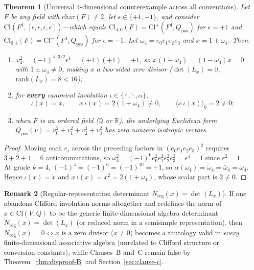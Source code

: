 \documentclass[11pt]{article}
\newtheorem{theorem}{Theorem}[section]
\theoremstyle{definition}
\newtheorem{remark}[theorem]{Remark}
\newcommand{\Cl}{\mathrm{Cl}}
\newcommand{\Nreg}{N_{\mathrm{reg}}}
\begin{document}
\begin{theorem}[Universal $4$-dimensional counterexample across all conventions]
\label{thm:dim4-universal}
Let $F$ be any field with $\mathrm{char}(F) \neq 2$, let $\epsilon \in \{+1, -1\}$,
and consider $\Cl(F^4, [\epsilon, \epsilon, \epsilon, \epsilon])$---which equals
$\Cl_{4,0}(F) = \Cl^+(F^4, Q_{\mathrm{pos}})$ for $\epsilon = +1$ and
$\Cl_{0,4}(F) = \Cl^-(F^4, Q_{\mathrm{pos}})$ for $\epsilon = -1$. Let
$\omega_4 = e_0 e_1 e_2 e_3$ and $x = 1 + \omega_4$. Then:
\begin{enumerate}
  \item $\omega_4^2 = (-1)^{4\cdot 3/2} \epsilon^4 = (+1)(+1) = +1$, so
    $x(1 - \omega_4) = (1 - \omega_4)x = 0$ with $1 \pm \omega_4 \neq 0$, making $x$
    a two-sided zero divisor ($\det(L_x) = 0$, $\mathrm{rank}(L_x) = 8 < 16$);
  \item for \textbf{every} canonical involution $\iota \in \{\bar{\cdot}, \tilde{\cdot}, \alpha\}$,
    \[
      \iota(x) = x, \qquad
      x\,\iota(x) = 2(1 + \omega_4) \neq 0, \qquad
      \langle x\,\iota(x)\rangle_0 = 2 \neq 0;
    \]
  \item when $F$ is an ordered field ($\mathbb{Q}$ or $\mathbb{R}$), the underlying
    Euclidean form $Q_{\mathrm{pos}}(v) = v_0^2 + v_1^2 + v_2^2 + v_3^2$ has zero
    nonzero isotropic vectors.
\end{enumerate}
\end{theorem}
\begin{proof}
Moving each $e_i$ across the preceding factors in $(e_0 e_1 e_2 e_3)^2$ requires
$3 + 2 + 1 = 6$ anticommutations, so $\omega_4^2 = (-1)^6 e_0^2 e_1^2 e_2^2 e_3^2
= \epsilon^4 = 1$ since $\epsilon^2 = 1$. At grade $k = 4$,
$(-1)^4 = (-1)^6 = (-1)^{10} = +1$, so $\alpha(\omega_4) = \tilde{\omega}_4 =
\bar{\omega}_4 = \omega_4$. Hence $\iota(x) = x$ and $x\,\iota(x) = x^2 = 2(1 + \omega_4)$,
whose scalar part is $2 \neq 0$.
\end{proof}

\begin{remark}[Regular-representation determinant $\Nreg(x) = \det(L_x)$]
If one abandons Clifford involution norms altogether and redefines the norm of
$x \in \Cl(V, Q)$ to be the generic finite-dimensional algebra determinant
$\Nreg(x) = \det(L_x)$ (or reduced norm in a semisimple representation), then
$\Nreg(x) = 0 \iff x \text{ is a zero divisor}$ ($x \neq 0$) becomes a tautology valid
in \emph{every} finite-dimensional associative algebra (unrelated to Clifford
structure or conversion constants), while Clauses~B and~C remain false by
Theorem~\ref{thm:disproof-B} and Section~\ref{sec:clause-c}.
\end{remark}
\end{document}
